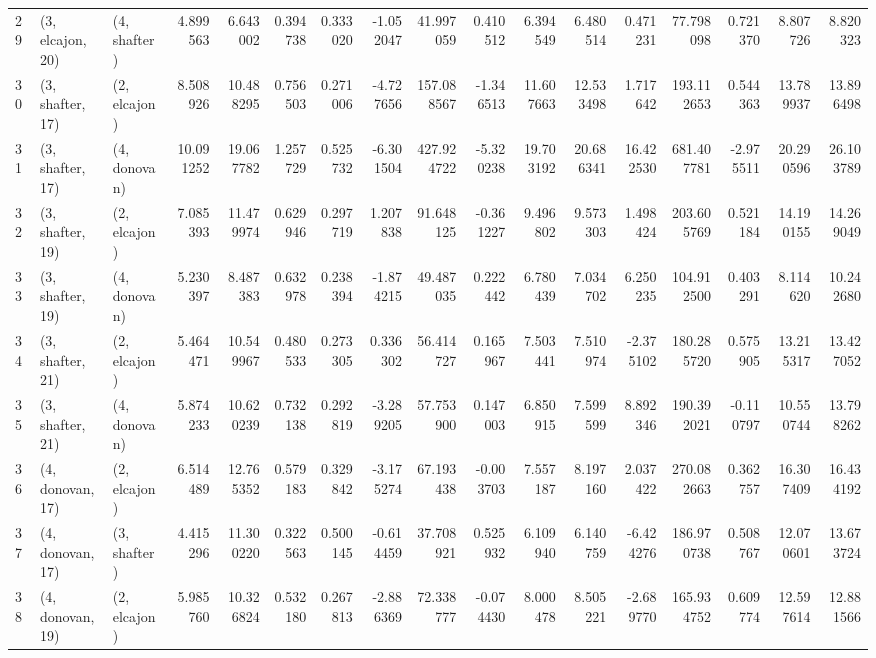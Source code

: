 \begin{tabular}{lllrrrrrrrrrrrrrr}
29 &  (3, elcajon, 20) &     (4, shafter) &   4.899563 &   6.643002 &   0.394738 &  0.333020 &  -1.052047 &   41.997059 &  0.410512 &   6.394549 &   6.480514 &   0.471231 &    77.798098 &  0.721370 &   8.807726 &   8.820323 \\
30 &  (3, shafter, 17) &     (2, elcajon) &   8.508926 &  10.488295 &   0.756503 &  0.271006 &  -4.727656 &  157.088567 & -1.346513 &  11.607663 &  12.533498 &   1.717642 &   193.112653 &  0.544363 &  13.789937 &  13.896498 \\
31 &  (3, shafter, 17) &     (4, donovan) &  10.091252 &  19.067782 &   1.257729 &  0.525732 &  -6.301504 &  427.924722 & -5.320238 &  19.703192 &  20.686341 &  16.422530 &   681.407781 & -2.975511 &  20.290596 &  26.103789 \\
32 &  (3, shafter, 19) &     (2, elcajon) &   7.085393 &  11.479974 &   0.629946 &  0.297719 &   1.207838 &   91.648125 & -0.361227 &   9.496802 &   9.573303 &   1.498424 &   203.605769 &  0.521184 &  14.190155 &  14.269049 \\
33 &  (3, shafter, 19) &     (4, donovan) &   5.230397 &   8.487383 &   0.632978 &  0.238394 &  -1.874215 &   49.487035 &  0.222442 &   6.780439 &   7.034702 &   6.250235 &   104.912500 &  0.403291 &   8.114620 &  10.242680 \\
34 &  (3, shafter, 21) &     (2, elcajon) &   5.464471 &  10.549967 &   0.480533 &  0.273305 &   0.336302 &   56.414727 &  0.165967 &   7.503441 &   7.510974 &  -2.375102 &   180.285720 &  0.575905 &  13.215317 &  13.427052 \\
35 &  (3, shafter, 21) &     (4, donovan) &   5.874233 &  10.620239 &   0.732138 &  0.292819 &  -3.289205 &   57.753900 &  0.147003 &   6.850915 &   7.599599 &   8.892346 &   190.392021 & -0.110797 &  10.550744 &  13.798262 \\
36 &  (4, donovan, 17) &     (2, elcajon) &   6.514489 &  12.765352 &   0.579183 &  0.329842 &  -3.175274 &   67.193438 & -0.003703 &   7.557187 &   8.197160 &   2.037422 &   270.082663 &  0.362757 &  16.307409 &  16.434192 \\
37 &  (4, donovan, 17) &     (3, shafter) &   4.415296 &  11.300220 &   0.322563 &  0.500145 &  -0.614459 &   37.708921 &  0.525932 &   6.109940 &   6.140759 &  -6.424276 &   186.970738 &  0.508767 &  12.070601 &  13.673724 \\
38 &  (4, donovan, 19) &     (2, elcajon) &   5.985760 &  10.326824 &   0.532180 &  0.267813 &  -2.886369 &   72.338777 & -0.074430 &   8.000478 &   8.505221 &  -2.689770 &   165.934752 &  0.609774 &  12.597614 &  12.881566 \\

\end{tabular}
